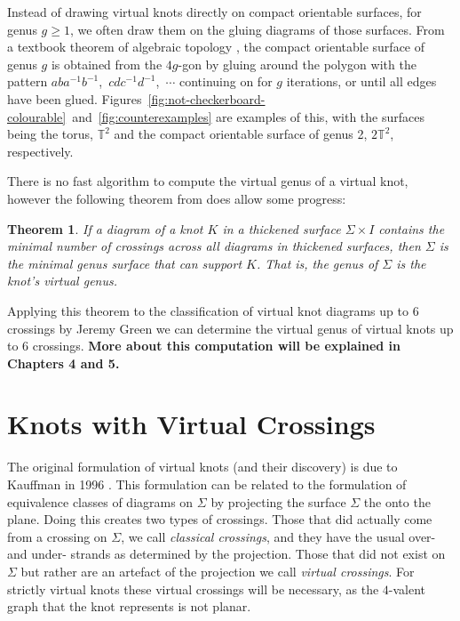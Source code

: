 \documentclass[12pt]{report}
\newcommand{\T}{\mathbb{T}}
\newcommand{\noteblue}[1]{{\color{Blue} \textbf{#1}}}
\newtheorem*{theorem}{Theorem}
\begin{document}
Instead of drawing virtual knots directly on compact orientable surfaces, for genus $g \geq 1$, we often draw them on the gluing diagrams of those surfaces. From a textbook theorem of algebraic topology \parencite{algebraic-topology}, the compact orientable surface of genus $g$ is obtained from the $4g$-gon by gluing around the polygon with the pattern $aba^{-1}b^{-1}$,~$cdc^{-1}d^{-1}$,~$\cdots$ continuing on for $g$ iterations, or until all edges have been glued. Figures~\ref{fig:not-checkerboard-colourable}~and~\ref{fig:counterexamples} are examples of this, with the surfaces being the torus, $\T^{2}$ and the compact orientable surface of genus 2, $2\T^{2}$, respectively.

There is no fast algorithm to compute the virtual genus of a virtual knot, however the following theorem from \cite{parity-and-projection} does allow some progress:
\begin{theorem}
	If a diagram of a knot $K$ in a thickened surface $\Sigma \times I$ contains the minimal number of crossings across all diagrams in thickened surfaces, then $\Sigma$ is the minimal genus surface that can support $K$. That is, the genus of $\Sigma$ is the knot's virtual genus.
\end{theorem}
Applying this theorem to the classification of virtual knot diagrams up to $6$ crossings by Jeremy Green \cite{virtual-knot-table} we can determine the virtual genus of virtual knots up to $6$ crossings. \noteblue{More about this computation will be explained in Chapters 4 and 5.}

\section{Knots with Virtual Crossings}

The original formulation of virtual knots (and their discovery) is due to Kauffman in 1996 \cite{virtual-knot-theory}. This formulation can be related to the formulation of equivalence classes of diagrams on $\Sigma$ by projecting the surface $\Sigma$ the onto the plane. Doing this creates two types of crossings. Those that did actually come from a crossing on $\Sigma$, we call \textit{classical crossings}, and they have the usual over- and under- strands as determined by the projection. Those that did not exist on $\Sigma$ but rather are an artefact of the projection we call \textit{virtual crossings}. For strictly virtual knots these virtual crossings will be necessary, as the $4$-valent graph that the knot represents is not planar.
\end{document}
